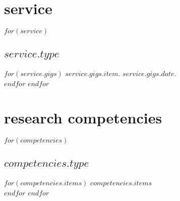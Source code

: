 \documentclass[11pt, a4paper]{article}
\begin{document}
\section{service}
$for(service)$
\subsection{$service.type$}
$for(service.gigs)$
$service.gigs.item$. $service.gigs.date$.\\[.15cm]
$endfor$
$endfor$


\section{research competencies}
$for(competencies)$
\subsection{$competencies.type$}
$for(competencies.items)$
$competencies.items$\\[.15cm]
$endfor$
$endfor$
\end{document}
